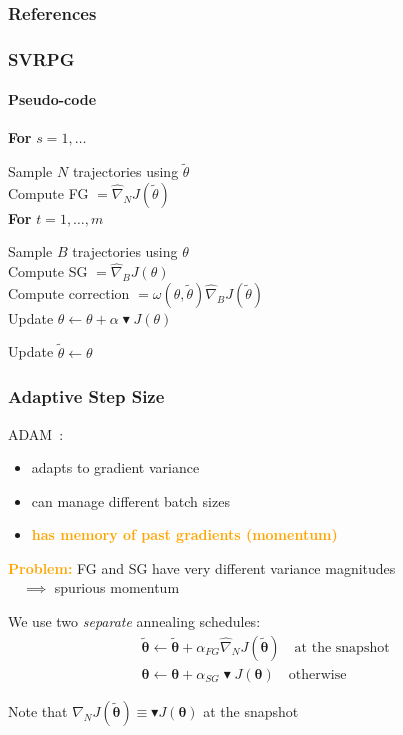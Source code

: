\documentclass[aspectratio=169]{beamer}
\newcommand{\eno}[1]{\textcolor{orange}{\textbf{#1}}}
\newcommand{\vtheta}{\boldsymbol{\theta}}
\newcommand{\gradBlack}[1]{\blacktriangledown J(#1)}
\begin{document}
\begin{frame}
\frametitle{References}

\end{frame}


\begin{frame} 
\frametitle{SVRPG} 
\framesubtitle{Pseudo-code}

\textbf{For} $s = 1,\ldots$
\vspace*{-.2cm}
\begin{rightbrace2}
	Sample $N$ trajectories using $\widetilde{\theta}$\\
	Compute FG $=\widehat{\nabla}_N J(\widetilde{\theta})$\\
	\textbf{For} $t = 1, \ldots, m$
	\vspace*{-.15cm}
	\begin{rightbrace1}
		Sample $B$ trajectories using $\theta$\\
		Compute SG $=\widehat{\nabla}_B J(\theta)$\\
		Compute correction $=\omega(\theta, \widetilde{\theta})\widehat{\nabla}_B J(\widetilde{\theta})$\\
		Update $\theta\gets\theta+\alpha\gradBlack{\theta}$
	\end{rightbrace1}
	\vspace*{-.15cm}
	Update $\widetilde{\theta}\gets\theta$
\end{rightbrace2}
\vspace*{-.2cm}

\end{frame}

\begin{frame} 
\frametitle{Adaptive Step Size} 
ADAM~\citep{kingma2014adam}:
\begin{itemize}
	\item adapts to gradient variance
	\item can manage different batch sizes
	\item \eno{has memory of past gradients (momentum)}
\end{itemize}
\vfill

\eno{Problem:} FG and SG have very different variance magnitudes \\
$\quad\implies$ spurious momentum
\vfill

We use two \textit{separate} annealing schedules:
\begin{align*}
&\widetilde{\vtheta} \gets \widetilde{\vtheta} + \alpha_{FG}\widehat{\nabla}_NJ(\widetilde{\vtheta})\quad\text{at the snapshot}\\ 
&\vtheta \gets \vtheta + \alpha_{SG}\gradBlack{\vtheta}\quad\text{otherwise}
\end{align*}
\vfill

Note that $\widehat{\nabla}_NJ(\widetilde{\vtheta})\equiv\gradBlack{\vtheta}$ at the snapshot

\end{frame}
\end{document}

